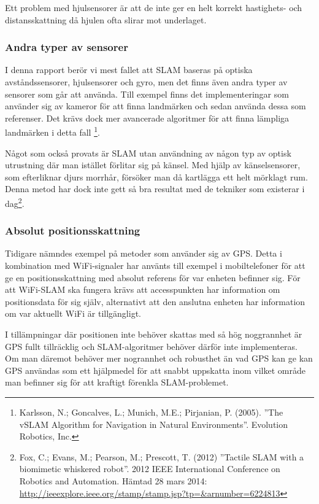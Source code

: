 \documentclass[a4paper,12pt,fleqn]{article}
\begin{document}
Ett problem med hjulsensorer är att de inte ger en helt korrekt hastighets- och distansskattning då hjulen ofta slirar mot underlaget.

\subsubsection{Andra typer av sensorer}

I denna rapport berör vi mest fallet att SLAM baseras på optiska avståndssensorer, hjulsensorer och gyro, men det finns även andra typer av sensorer som går att använda. Till exempel finns det implementeringar som använder sig av kameror för att finna landmärken och sedan använda dessa som referenser. Det krävs dock mer avancerade algoritmer för att finna lämpliga landmärken i detta fall \footnote{Karlsson, N.; Goncalves, L.; Munich, M.E.; Pirjanian, P. (2005). ''The vSLAM Algorithm for Navigation in Natural Environments''. Evolution Robotics, Inc.}.

Något som också provats är SLAM utan användning av någon typ av optisk utrustning där man istället förlitar sig på känsel. Med hjälp av känselsensorer, som efterliknar djurs morrhår, försöker man då kartlägga ett helt mörklagt rum. Denna metod har dock inte gett så bra resultat med de tekniker som existerar i dag\footnote{Fox, C.; Evans, M.; Pearson, M.; Prescott, T. (2012)
''Tactile SLAM with a biomimetic whiskered robot''. 2012 IEEE International Conference on Robotics and Automation. Hämtad 28 mars 2014:
\url{http://ieeexplore.ieee.org/stamp/stamp.jsp?tp=&arnumber=6224813}
}. 

\subsubsection{Absolut positionsskattning}Tidigare nämndes exempel på metoder som använder sig av GPS. Detta i kombination med WiFi-signaler har använts till exempel i mobiltelefoner för att ge en positionsskattning med absolut referens för var enheten befinner sig. För att WiFi-SLAM ska fungera krävs att accesspunkten har information om positionsdata för sig själv, alternativt att den anslutna enheten har information om var aktuellt WiFi är tillgängligt.

I tillämpningar där positionen inte behöver skattas med så hög noggrannhet är GPS fullt tillräcklig och SLAM-algoritmer behöver därför inte implementeras. Om man däremot behöver mer nogrannhet och robusthet än vad GPS kan ge kan GPS användas som ett hjälpmedel för att snabbt uppskatta inom vilket område man befinner sig för att kraftigt förenkla SLAM-problemet. 
\end{document}
